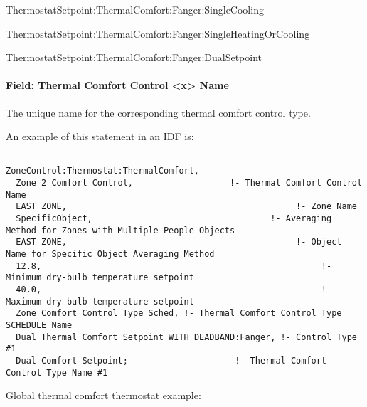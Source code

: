 ThermostatSetpoint:ThermalComfort:Fanger:SingleCooling

ThermostatSetpoint:ThermalComfort:Fanger:SingleHeatingOrCooling

ThermostatSetpoint:ThermalComfort:Fanger:DualSetpoint

\paragraph{Field: Thermal Comfort Control \textless{}x\textgreater{} Name}\label{field-thermal-comfort-control-x-name}

The unique name for the corresponding thermal comfort control type.

An example of this statement in an IDF is:

\begin{lstlisting}

ZoneControl:Thermostat:ThermalComfort,
  Zone 2 Comfort Control,                   !- Thermal Comfort Control Name
  EAST ZONE,                                             !- Zone Name
  SpecificObject,                                   !- Averaging Method for Zones with Multiple People Objects
  EAST ZONE,                                             !- Object Name for Specific Object Averaging Method
  12.8,                                                       !- Minimum dry-bulb temperature setpoint
  40.0,                                                       !- Maximum dry-bulb temperature setpoint
  Zone Comfort Control Type Sched, !- Thermal Comfort Control Type SCHEDULE Name
  Dual Thermal Comfort Setpoint WITH DEADBAND:Fanger, !- Control Type #1
  Dual Comfort Setpoint;                     !- Thermal Comfort Control Type Name #1
\end{lstlisting}

Global thermal comfort thermostat example:

